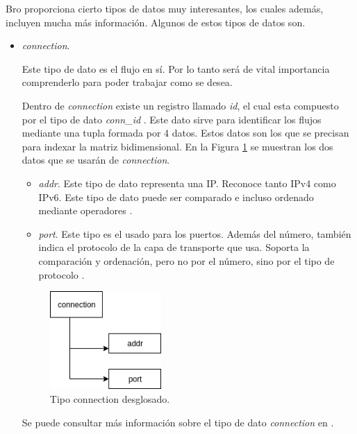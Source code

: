 \intro Bro proporciona cierto tipos de datos muy interesantes, los cuales además, incluyen mucha más información. Algunos de estos 
tipos de datos son. 

\begin{itemize}

\item \textit{connection}. 

\intro Este tipo de dato es el flujo en sí. Por lo tanto será de vital importancia comprenderlo para poder trabajar como se desea.

\intro Dentro de \textit{connection} existe un registro llamado \textit{id}, el cual esta compuesto por el tipo de dato \textit{conn\_id} \cite{broconnid}. Este dato sirve para identificar los flujos mediante una tupla formada por 4 datos. Estos datos son los que se 
precisan para indexar la matriz bidimensional. En la Figura \ref{fig.connection} se muestran los dos datos que se usarán de \textit{connection}.

  \begin{itemize}

  \item \textit{addr}. Este tipo de dato representa una IP. Reconoce tanto IPv4 como IPv6. Este tipo de dato puede 
  ser comparado e incluso ordenado mediante operadores \cite{broaddr}.

  \item \textit{port}. Este tipo es el usado para los puertos. Además del número, también indica el 
  protocolo de la capa de transporte que usa. Soporta la comparación y ordenación, pero no por el número, sino por 
  el tipo de protocolo \cite{broport}.
  \end{itemize}

\begin{figure}[H]
  \includegraphics[width=0.4\textwidth]{imagenes/connection.png}
  \centering
  \caption{Tipo connection desglosado.}\label{fig.connection}
\end{figure}

  
\intro Se puede consultar más información sobre el tipo de dato \textit{connection} en \cite{connectiontype}.


\end{itemize}

